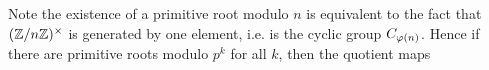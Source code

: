 \begin{rem}
%
%
%
%
Note the existence of a primitive root modulo $n$ is equivalent to the fact that $(\mathbb{Z}/n\mathbb{Z})^{\times}$ is generated by one element, i.e. is the cyclic group $C_{\varphi(n)}$. Hence if there are primitive roots modulo $p^k$ for all $k$, then the quotient maps

\end{rem}
